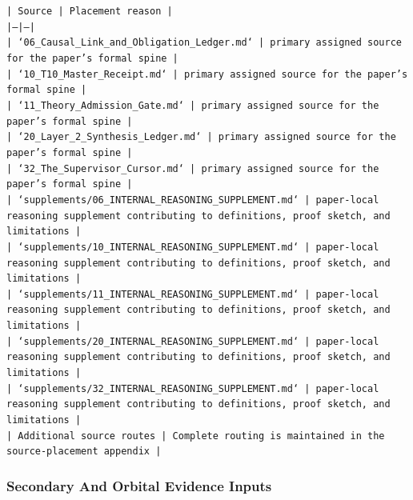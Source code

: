 \documentclass[11pt]{article}
\begin{document}
\noindent\texttt{| Source | Placement reason |}\\
\noindent\texttt{|---|---|}\\
\noindent\texttt{| `06\_Causal\_Link\_and\_Obligation\_Ledger.md` | primary assigned source for the paper's formal spine |}\\
\noindent\texttt{| `10\_T10\_Master\_Receipt.md` | primary assigned source for the paper's formal spine |}\\
\noindent\texttt{| `11\_Theory\_Admission\_Gate.md` | primary assigned source for the paper's formal spine |}\\
\noindent\texttt{| `20\_Layer\_2\_Synthesis\_Ledger.md` | primary assigned source for the paper's formal spine |}\\
\noindent\texttt{| `32\_The\_Supervisor\_Cursor.md` | primary assigned source for the paper's formal spine |}\\
\noindent\texttt{| `supplements/06\_INTERNAL\_REASONING\_SUPPLEMENT.md` | paper-local reasoning supplement contributing to definitions, proof sketch, and limitations |}\\
\noindent\texttt{| `supplements/10\_INTERNAL\_REASONING\_SUPPLEMENT.md` | paper-local reasoning supplement contributing to definitions, proof sketch, and limitations |}\\
\noindent\texttt{| `supplements/11\_INTERNAL\_REASONING\_SUPPLEMENT.md` | paper-local reasoning supplement contributing to definitions, proof sketch, and limitations |}\\
\noindent\texttt{| `supplements/20\_INTERNAL\_REASONING\_SUPPLEMENT.md` | paper-local reasoning supplement contributing to definitions, proof sketch, and limitations |}\\
\noindent\texttt{| `supplements/32\_INTERNAL\_REASONING\_SUPPLEMENT.md` | paper-local reasoning supplement contributing to definitions, proof sketch, and limitations |}\\
\noindent\texttt{| Additional source routes | Complete routing is maintained in the source-placement appendix |}\\

\subsubsection*{Secondary And Orbital Evidence Inputs}
\end{document}
